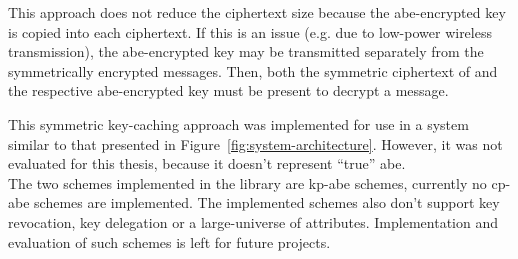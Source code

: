 This approach does not reduce the ciphertext size because the \acrshort{abe}-encrypted key is copied into each ciphertext.
If this is an issue (e.g. due to low-power wireless transmission), the \acrshort{abe}-encrypted key may be transmitted separately from the symmetrically encrypted messages.
Then, both the symmetric ciphertext of and the respective \acrshort{abe}-encrypted key must be present to decrypt a message.

This symmetric key-caching approach was implemented for use in a system similar to that presented in Figure~\ref{fig:system-architecture}.
However, it was not evaluated for this thesis, because it doesn't represent ``true'' \acrlong{abe}.
~\\

The two schemes implemented in the library are \acrshort{kp-abe} schemes, currently no \acrshort{cp-abe} schemes are implemented.
The implemented schemes also don't support key revocation, key delegation or a \gls{large-universe} of attributes. 
Implementation and evaluation of such schemes is left for future projects.
